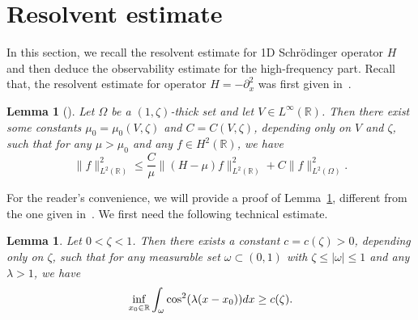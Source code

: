 \documentclass[a4paper,reqno]{amsart}
\newtheorem{corollary}[theorem]{Corollary}
\newtheorem{lemma}[theorem]{Lemma}
\theoremstyle{definition}
\numberwithin{equation}{section}
\newcommand{\R}{\mathbb{R}}
\def \R {{\mathbb{R} }}
\def \d {{\rm{d}}}
\begin{document}




\section{Resolvent estimate}\label{SS:RESO}
In this section, we recall the resolvent estimate for 1D Schr\"odinger operator $H$ and then deduce the observability estimate for the high-frequency part. Recall that, the resolvent estimate for operator $H=-\partial_x^2$ was first given in~\cite[Proposition 1]{Gr}. 

\begin{lemma}[\cite{Gr}]\label{le:resolvent}
Let $\Omega$ be a $(1,\zeta)$-thick set and let $V\in L^{\infty}(\R)$. Then there exist some constants $\mu_{0}=\mu_{0}(V,\zeta)$ and $C=C(V,\zeta)$, depending only on $V$ and $\zeta$, such that for any $\mu>\mu_{0}$ and any $f\in H^{2}(\R)$, we have 
\begin{equation*}
\|f\|_{L^{2}(\R)}^{2}\le \frac{C}{\mu}\|({H}-\mu)f\|_{L^{2}(\R)}^{2}+C\|f\|_{L^{2}(\Omega)}^{2}.
\end{equation*}
\end{lemma}

For the reader's convenience, we will provide a proof of Lemma~\ref{le:resolvent}, different from the one given in~\cite{Gr}. We first need the following technical estimate.
\begin{lemma}\label{le:technical}
    Let $0<\zeta<1$. Then there exists a constant $c=c(\zeta)>0$, depending only on $\zeta$, such that for any measurable set $\omega\subset (0,1)$ with $\zeta\le |\omega|\le 1$ and any $\lambda>1$, we have 
    \begin{equation}\label{est:A}
       \inf_{x_{0}\in \R} \int_{\omega}\cos^{2}(\lambda(x-x_{0}))\d x\ge c(\zeta).
    \end{equation}
\end{lemma}
\end{document}
